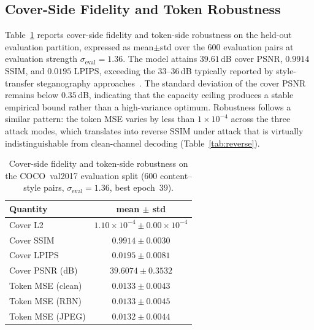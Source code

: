 \documentclass[conference]{IEEEtran}
\begin{document}
\subsection{Cover-Side Fidelity and Token Robustness}
\label{sec:exp_coco}
Table~\ref{tab:cover} reports cover-side fidelity and token-side robustness on the held-out evaluation partition, expressed as mean$\pm$std over the $600$ evaluation pairs at evaluation strength $\sigma_{\text{eval}}\!=\!1.36$. The model attains $39.61$\,dB cover PSNR, $0.9914$ SSIM, and $0.0195$ LPIPS, exceeding the $33$--$36$\,dB typically reported by style-transfer steganography approaches~\cite{stylestegan2023, sst2024, stisgan2026}. The standard deviation of the cover PSNR remains below $0.35$\,dB, indicating that the capacity ceiling produces a stable empirical bound rather than a high-variance optimum. Robustness follows a similar pattern: the token MSE varies by less than $1\!\times\!10^{-4}$ across the three attack modes, which translates into reverse SSIM under attack that is virtually indistinguishable from clean-channel decoding (Table~\ref{tab:reverse}).

\begin{table}[t]
\centering
\caption{Cover-side fidelity and token-side robustness on the COCO~val2017 evaluation split ($600$ content--style pairs, $\sigma_{\text{eval}}=1.36$, best epoch~$39$).}
\label{tab:cover}
\setlength{\tabcolsep}{8pt}
\begin{tabular}{l c}
\toprule
\textbf{Quantity} & \textbf{mean $\pm$ std} \\
\midrule
Cover L2          & $1.10\!\times\!10^{-4} \pm 0.00\!\times\!10^{-4}$ \\
\rowcolor{rowshade}
Cover SSIM        & $0.9914 \pm 0.0030$ \\
Cover LPIPS       & $0.0195 \pm 0.0081$ \\
\rowcolor{rowshade}
Cover PSNR (dB)   & $\mathbf{39.6074 \pm 0.3532}$ \\
\midrule
Token MSE (clean) & $0.0133 \pm 0.0043$ \\
\rowcolor{rowshade}
Token MSE (RBN)   & $0.0133 \pm 0.0045$ \\
Token MSE (JPEG)  & $0.0132 \pm 0.0044$ \\
\bottomrule
\end{tabular}
\end{table}
\end{document}
